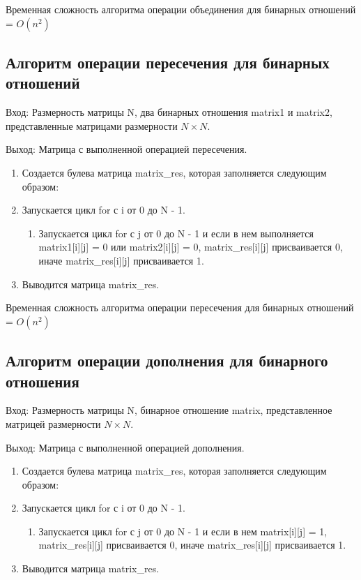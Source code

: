 \documentclass[bachelor, och, labwork]{shiza}
\begin{document}
	Временная сложность алгоритма операции объединения для бинарных отношений = $O(n^2)$	
	
	\subsection{Алгоритм операции пересечения для бинарных отношений}

		$\textit{Вход:}$ Размерность матрицы N, два бинарных отношения matrix1 и matrix2, представленные матрицами размерности $N \times N$.

		$\textit{Выход:}$  Матрица с выполненной операцией пересечения.
		
	\begin{enumerate} 
		\item Создается булева матрица matrix\_res, которая заполняется следующим образом:
		\item Запускается цикл for с i от 0 до N - 1.
		\begin{enumerate} 
			\item Запускается цикл for с j от 0 до N - 1 и если в нем выполняется matrix1[i][j] = 0 или
			matrix2[i][j] = 0, matrix\_res[i][j] присваивается 0, иначе matrix\_res[i][j] присваивается 1.
		\end{enumerate}
		\item Выводится матрица matrix\_res.
	\end{enumerate} 
	
	Временная сложность алгоритма операции пересечения для бинарных отношений = $O(n^2)$

	\subsection{Алгоритм операции дополнения для бинарного отношения}
	
		$\textit{Вход:}$ Размерность матрицы N, бинарное отношение matrix, представленное матрицей размерности $N \times N$.

		$\textit{Выход:}$  Матрица с выполненной операцией дополнения.	
	
	\begin{enumerate} 
		\item Создается булева матрица matrix\_res, которая заполняется следующим образом:
		\item Запускается цикл for с i от 0 до N - 1.
		\begin{enumerate} 
			\item Запускается цикл for с j от 0 до N - 1 и если в нем  matrix[i][j] = 1, matrix\_res[i][j] присваивается 0, иначе matrix\_res[i][j] присваивается 1.
		\end{enumerate}
		\item Выводится матрица matrix\_res.
	\end{enumerate} 
	
\end{document}

